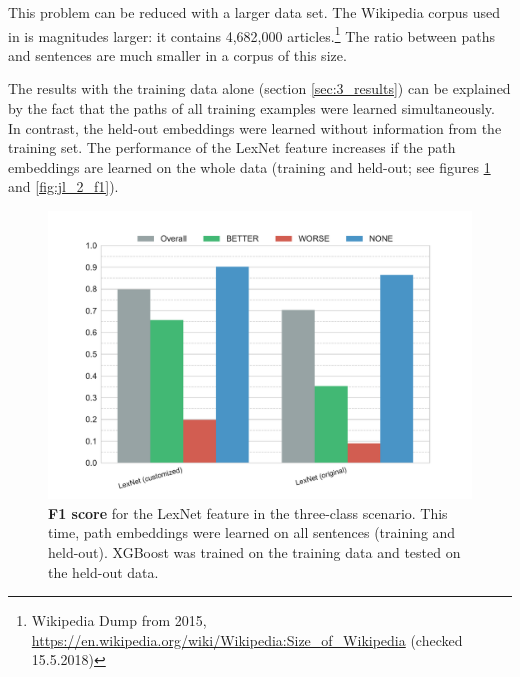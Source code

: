 This problem can be reduced with a larger data set. The Wikipedia corpus used in \cite{DBLP:conf/acl/ShwartzGD16} is magnitudes larger: it contains 4,682,000 articles.\footnote{Wikipedia Dump from 2015, \url{https://en.wikipedia.org/wiki/Wikipedia:Size_of_Wikipedia} (checked 15.5.2018)} The ratio between paths and sentences are much smaller in a corpus of this size.

The results with the training data alone (section \ref{sec:3_results}) can be explained by the fact that the paths of all training examples were learned simultaneously. In contrast, the held-out embeddings were learned without information from the training set. The performance of the LexNet feature increases if the path embeddings are learned on the whole data (training and held-out; see figures \ref{fig:jl_3_f1} and  \ref{fig:jl_2_f1}).


\begin{figure}[htbp]
         \caption{\textbf{F1 score} for the LexNet feature in the three-class scenario. This time, path embeddings were learned on all sentences (training and held-out). XGBoost was trained on the training data and tested on the held-out data.} 
    \label{fig:jl_3_f1}
    \centering
	\includegraphics[width=1\linewidth]{images/extra/jl-f1-False}
    \end{figure}
    
